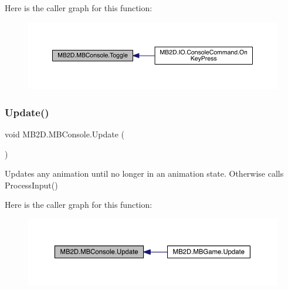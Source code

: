 Here is the caller graph for this function\+:\nopagebreak
\begin{figure}[H]
\begin{center}
\leavevmode
\includegraphics[width=350pt]{class_m_b2_d_1_1_m_b_console_aab4c284a98afb148e35cf28e6d8ba0fc_icgraph}
\end{center}
\end{figure}
\hypertarget{class_m_b2_d_1_1_m_b_console_a4239aee536dc49bbbd59d81d79f24266}{}\label{class_m_b2_d_1_1_m_b_console_a4239aee536dc49bbbd59d81d79f24266} 
\subsubsection{\texorpdfstring{Update()}{Update()}}
{\footnotesize\ttfamily void M\+B2\+D.\+M\+B\+Console.\+Update (\begin{DoxyParamCaption}{ }\end{DoxyParamCaption})\hspace{0.3cm}{\ttfamily [inline]}}



Updates any animation until no longer in an animation state. Otherwise calls Process\+Input() 

Here is the caller graph for this function\+:\nopagebreak
\begin{figure}[H]
\begin{center}
\leavevmode
\includegraphics[width=350pt]{class_m_b2_d_1_1_m_b_console_a4239aee536dc49bbbd59d81d79f24266_icgraph}
\end{center}
\end{figure}
\hypertarget{class_m_b2_d_1_1_m_b_console_a1d85081cb5400f09883c1fc62f37d861}{}\label{class_m_b2_d_1_1_m_b_console_a1d85081cb5400f09883c1fc62f37d861} 
